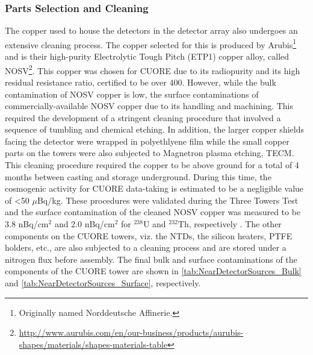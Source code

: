 \subsubsection{Parts Selection and Cleaning}
\label{ssec:Parts Selection and Cleaning}
The copper used to house the detectors in the detector array also undergoes an extensive cleaning process.
The copper selected for this is produced by Arubis\footnote{Originally named Norddeutsche Affinerie.} and is their high-purity Electrolytic Tough Pitch (ETP1) copper alloy, called NOSV\footnote{\RaggedRight\url{http://www.aurubis.com/en/our-business/products/aurubis-shapes/materials/shapes-materials-table}}.
This copper was chosen for CUORE due to its radiopurity and its high residual resistance ratio, certified to be over 400.
However, while the bulk contamination of NOSV copper is low, the surface contaminations of commercially-available NOSV copper due to its handling and machining.
This required the development of a stringent cleaning procedure that involved a sequence of tumbling and chemical etching.
In addition, the larger copper shields facing the detector were wrapped in polyethlyene film while the small copper parts on the towers were also subjected to Magnetron plasma etching, TECM.
This cleaning procedure required the copper to be above ground for a total of 4 months between casting and storage underground.
During this time, the cosmogenic activity for CUORE data-taking is estimated to be a negligible value of <50 $\mu$Bq$/$kg.
These procedures were validated during the Three Towers Test  and the surface contamination of the cleaned NOSV copper was measured to be 3.8 nBq/cm$^2$ and 2.0 nBq/cm$^2$ for $^{238}$U and $^{232}$Th, respectively \cite{ALESSANDRIA201313}.
The other components on the CUORE towers, viz. the NTDs, the silicon heaters, PTFE holders, etc., are also subjected to a cleaning process and are stored under a nitrogen flux before assembly.
The final bulk and surface contaminations of the components of the CUORE tower are shown in \autoref{tab:NearDetectorSources_Bulk} and \autoref{tab:NearDetectorSources_Surface}, respectively.

